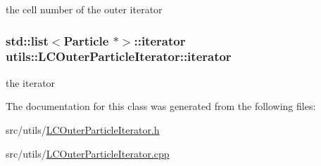the cell number of the outer iterator \hypertarget{classutils_1_1LCOuterParticleIterator_ab01cb9c518e6f5e97b4b99b8a1af88e5}{
\subsubsection[{iterator}]{\setlength{\rightskip}{0pt plus 5cm}std\-::list$<${\bf Particle} $\ast$$>$\-::iterator utils\-::\-L\-C\-Outer\-Particle\-Iterator\-::iterator\hspace{0.3cm}{\ttfamily [private]}}}\label{classutils_1_1LCOuterParticleIterator_ab01cb9c518e6f5e97b4b99b8a1af88e5}
the iterator 

The documentation for this class was generated from the following files\-:\begin{DoxyCompactItemize}
\item 
src/utils/\hyperlink{LCOuterParticleIterator_8h}{L\-C\-Outer\-Particle\-Iterator.\-h}\item 
src/utils/\hyperlink{LCOuterParticleIterator_8cpp}{L\-C\-Outer\-Particle\-Iterator.\-cpp}\end{DoxyCompactItemize}
